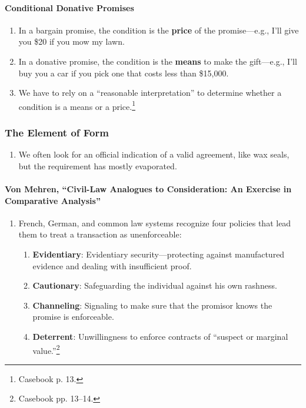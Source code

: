 \paragraph{Conditional Donative Promises}

\begin{enumerate}
    \item In a bargain promise, the condition is the \textbf{price} of the 
    promise---e.g., I'll give you \$20 if you mow my lawn.
    \item In a donative promise, the condition is the \textbf{means} to make 
    the gift---e.g., I'll buy you a car if you pick one that costs less than 
    \$15,000. 
    \item We have to rely on a ``reasonable interpretation'' to determine 
    whether a condition is a means or a price.\footnote{Casebook p. 13.}
\end{enumerate}

\subsubsection{The Element of Form}

\begin{enumerate}
    \item We often look for an official indication of a valid 
    agreement, like wax seals, but the requirement has mostly evaporated.
\end{enumerate}

\paragraph{Von Mehren, ``Civil-Law Analogues to Consideration: An Exercise 
in Comparative Analysis''}

\begin{enumerate}
    \item French, German, and common law systems recognize four policies that 
    lead them to treat a transaction as unenforceable:
    \begin{enumerate}
        \item \textbf{Evidentiary}: Evidentiary security---protecting against 
        manufactured evidence and dealing with insufficient proof.
        \item \textbf{Cautionary}: Safeguarding the individual against his own 
        rashness.
        \item \textbf{Channeling}: Signaling to make sure that the promisor 
        knows the promise is enforceable.
        \item \textbf{Deterrent}: Unwillingness to enforce contracts of 
        ``suspect or marginal value.''\footnote{Casebook pp. 13--14.}
    \end{enumerate}
\end{enumerate}

